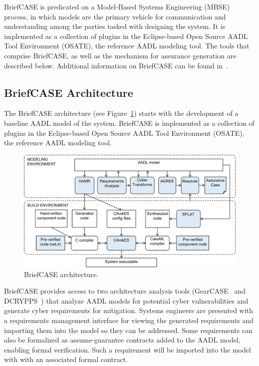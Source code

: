 
BriefCASE is predicated on a Model-Based Systems Engineering (MBSE) process, in which models are the primary vehicle for communication and understanding among the parties tasked with designing the system. 
It is implemented as a collection of plugins in the Eclipse-based Open Source AADL Tool Environment (OSATE), the reference AADL modeling tool. The tools that comprise BriefCASE, as well as the mechanism for assurance generation are described below.  Additional information on BriefCASE can be found in~\cite{case-at-scale}.

\subsection{BriefCASE Architecture}

The BriefCASE architecture (see Figure~\ref{fig:briefcase-architecture}) starts with the development of a baseline AADL model of the system. BriefCASE is implemented as a collection of plugins in the Eclipse-based Open Source AADL Tool Environment (OSATE), the reference AADL modeling tool. 

\begin{figure}[h] 
	\centering 
	\includegraphics[width=\textwidth]{figs/briefcase-architecture.png}
	\caption{BriefCASE architecture.}
	\label{fig:briefcase-architecture} 
\end{figure}


BriefCASE provides access to two architecture analysis tools (GearCASE~\cite{gearcase2020} and DCRYPPS~\cite{dcrypps2019}) that analyze AADL models for potential cyber vulnerabilities and generate cyber requirements for mitigation. 
Systems engineers are presented with a requirements management interface for viewing the generated requirements and importing them into the model so they can be addressed.  
Some requirements can also be formalized as assume-guarantee contracts added to the AADL model, enabling formal verification. Such a requirement will be imported into the model with with an associated formal contract.


